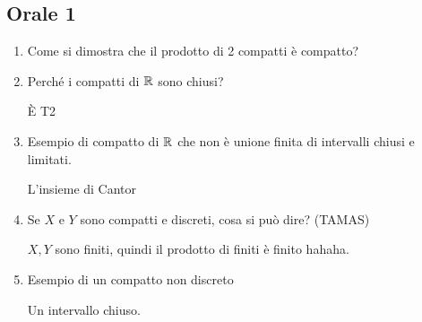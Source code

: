 \documentclass[]{article}
\begin{document}
\subsection{Orale 1}
\begin{enumerate}
    \item Come si dimostra che il prodotto di 2 compatti \`e compatto? 
    \item Perch\'e i compatti di $\mathbb{R}$ sono chiusi?
           \begin{answer}
            \`E T2
           \end{answer} 
    \item Esempio di compatto di $\mathbb{R}$ che non \`e unione finita di intervalli chiusi e limitati.  
        \begin{answer}
            L'insieme di Cantor
        \end{answer}
    \item Se $X$ e $Y$ sono compatti e discreti, cosa si pu\`o dire? (TAMAS)
        \begin{answer}
            $X, Y$ sono finiti, quindi il prodotto di finiti \`e finito hahaha.
        \end{answer}
    \item Esempio di un compatto non discreto
        \begin{answer}
            Un intervallo chiuso.
        \end{answer}
\end{enumerate}
\end{document}
